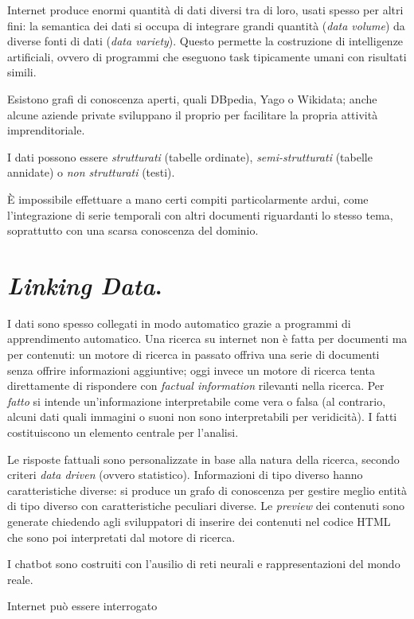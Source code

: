 \documentclass[11pt, twocolumn]{article}
\begin{document}
Internet produce enormi quantità di dati diversi tra di loro, usati spesso per altri fini: la semantica dei dati si occupa di integrare grandi quantità (\textit{data volume}) da diverse fonti di dati (\textit{data variety}).
Questo permette la costruzione di intelligenze artificiali, ovvero di programmi che eseguono task tipicamente umani con risultati simili.

Esistono grafi di conoscenza aperti, quali DBpedia, Yago o Wikidata; anche alcune aziende private sviluppano il proprio per facilitare la propria attività imprenditoriale.

I dati possono essere \textit{strutturati} (tabelle ordinate), \textit{semi-strutturati} (tabelle annidate) o \textit{non strutturati} (testi).

È impossibile effettuare a mano certi compiti particolarmente ardui, come l'integrazione di serie temporali con altri documenti riguardanti lo stesso tema, soprattutto con una scarsa conoscenza del dominio.

\section{\textit{Linking Data}.}
I dati sono spesso collegati in modo automatico grazie a programmi di apprendimento automatico.
Una ricerca su internet non è fatta per documenti ma per contenuti: un motore di ricerca in passato offriva una serie di documenti senza offrire informazioni aggiuntive; oggi invece un motore di ricerca tenta direttamente di rispondere con \textit{factual information} rilevanti nella ricerca.
Per \textit{fatto} si intende un'informazione interpretabile come vera o falsa (al contrario, alcuni dati quali immagini o suoni non sono interpretabili per veridicità).
I fatti costituiscono un elemento centrale per l'analisi.

Le risposte fattuali sono personalizzate in base alla natura della ricerca, secondo criteri \textit{data driven} (ovvero statistico).
Informazioni di tipo diverso hanno caratteristiche diverse: si produce un grafo di conoscenza per gestire meglio entità di tipo diverso con caratteristiche peculiari diverse.
Le \textit{preview} dei contenuti sono generate chiedendo agli sviluppatori di inserire dei contenuti nel codice HTML che sono poi interpretati dal motore di ricerca.

I chatbot sono costruiti con l'ausilio di reti neurali e rappresentazioni del mondo reale.

Internet può essere interrogato
\end{document}
